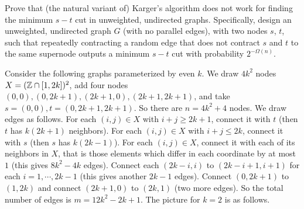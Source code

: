 \newpage
\pb

Prove that (the natural variant of) Karger’s algorithm does not work for finding the minimum $s-t$ cut in unweighted, undirected graphs. Specifically, design an unweighted, undirected graph $G$ (with no parallel edges), with two nodes $s$, $t$, such that repeatedly contracting a random edge that does not contract $s$ and $t$ to the same supernode outputs a minimum $s-t$ cut with probability $2^{-\Omega(n)}$.

\soln


Consider the following graphs parameterized by even $k$. We draw $4k^{2}$ nodes $X=(\mathbb{Z}\cap[1,2k])^{2}$, add four nodes $(0,0), (0,2k+1), (2k+1,0), (2k+1,2k+1)$, and take $s=(0,0), t=(0,2k+1,2k+1)$. So there are $n=4k^{2}+4$ nodes. We draw edges as follows. For each $(i,j)\in X$ with $i+j\ge 2k+1$, connect it with $t$ (then $t$ has $k(2k+1)$ neighbors). For each $(i,j)\in X$ with $i+j \le 2k$, connect it with $s$ (then $s$ has $k(2k-1)$). For each $(i,j)\in X$, connect it with each of its neighbors in $X$, that is those elements which differ in each coordinate by at most $1$ (this gives $8k^{2}-4k$ edges). Connect each $(2k-i,i)$ to $(2k-i+1,i+1)$ for each $i=1,\cdots,2k-1$ (this gives another $2k-1$ edges). Connect $(0,2k+1)$ to $(1,2k)$ and connect $(2k+1,0)$ to $(2k,1)$ (two more edges). So the total number of edges is $m=12k^{2}-2k+1$. The picture for $k=2$ is as follows.

